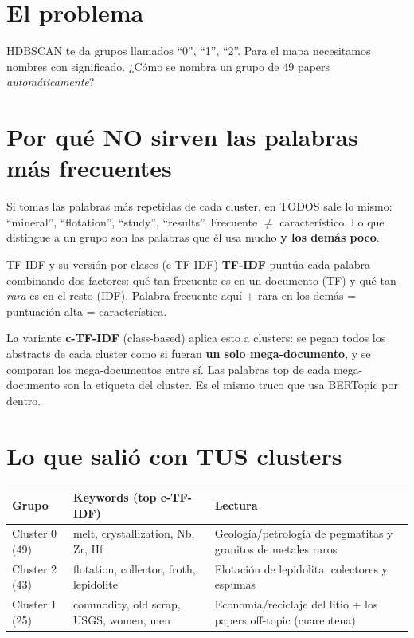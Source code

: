 \documentclass[11pt,a4paper]{article}
\begin{document}
\section{El problema}

HDBSCAN te da grupos llamados ``0'', ``1'', ``2''. Para el mapa necesitamos nombres con
significado. ¿Cómo se nombra un grupo de 49 papers \emph{automáticamente}?

\section{Por qué NO sirven las palabras más frecuentes}

Si tomas las palabras más repetidas de cada cluster, en TODOS sale lo mismo: ``mineral'',
``flotation'', ``study'', ``results''. Frecuente $\neq$ característico. Lo que distingue a un
grupo son las palabras que él usa mucho \textbf{y los demás poco}.

\begin{concepto}{TF-IDF y su versión por clases (c-TF-IDF)}
\textbf{TF-IDF} puntúa cada palabra combinando dos factores: qué tan frecuente es en un
documento (TF) y qué tan \emph{rara} es en el resto (IDF). Palabra frecuente aquí + rara en
los demás = puntuación alta = característica.

La variante \textbf{c-TF-IDF} (class-based) aplica esto a clusters: se pegan todos los
abstracts de cada cluster como si fueran \textbf{un solo mega-documento}, y se comparan los
mega-documentos entre sí. Las palabras top de cada mega-documento son la etiqueta del cluster.
Es el mismo truco que usa BERTopic por dentro.
\end{concepto}

\section{Lo que salió con TUS clusters}

\begin{center}
\begin{tabular}{lp{5.2cm}p{5.2cm}}
\textbf{Grupo} & \textbf{Keywords (top c-TF-IDF)} & \textbf{Lectura} \\
\hline
Cluster 0 (49) & melt, crystallization, Nb, Zr, Hf & Geología/petrología de pegmatitas y
granitos de metales raros \\
Cluster 2 (43) & flotation, collector, froth, lepidolite & Flotación de lepidolita:
colectores y espumas \\
Cluster 1 (25) & commodity, old scrap, USGS, women, men & Economía/reciclaje del litio + los
papers off-topic (cuarentena) \\
\end{tabular}
\end{center}
\end{document}
